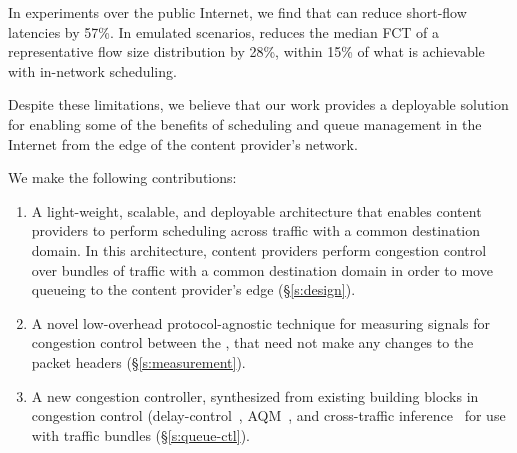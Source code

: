 In experiments over the public Internet, we find that \name can reduce short-flow latencies by 57\%. In emulated scenarios, \name reduces the median FCT of a representative flow size distribution by 28\%, within 15\% of what is achievable with in-network scheduling.

Despite these limitations, we believe that our work provides a deployable solution for enabling some of the benefits of scheduling and queue management in the Internet from the edge of the content provider's network.
 \fi
 
We make the following contributions:
\begin{enumerate}
    \item A light-weight, scalable, and deployable architecture that enables content providers to perform scheduling across traffic with a common destination domain. In this architecture, content providers perform congestion control over bundles of traffic with a common destination domain in order to move queueing to the content provider's edge (\S\ref{s:design}).
     \item A novel low-overhead protocol-agnostic technique for measuring signals for congestion control between the \pair, that need not make any changes to the packet headers (\S\ref{s:measurement}).
     \item A new congestion controller, synthesized from existing building blocks in congestion control (delay-control~\cite{copa}, AQM~\cite{pie}, and cross-traffic inference~\cite{nimbus} for use with traffic bundles (\S\ref{s:queue-ctl}).
\end{enumerate}
\fi